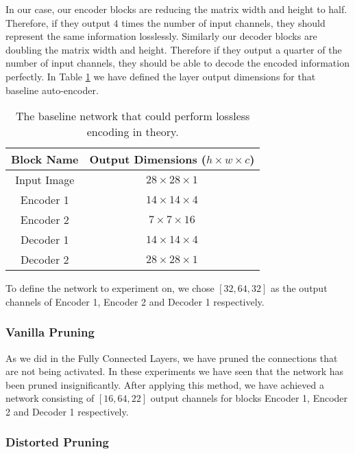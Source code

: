 In our case, our encoder blocks are reducing the matrix width and height to half. Therefore, if they output $4$ times the number of input channels, they should represent the same information losslessly. Similarly our decoder blocks are doubling the matrix width and height. Therefore if they output a quarter of the number of input channels, they should be able to decode the encoded information perfectly. In Table \ref{tab:mnist_baseline_encoder} we have defined the layer output dimensions for that baseline auto-encoder.
\begin{table}
\begin{center}
\begin{tabular}{ c | c }
 Block Name & Output Dimensions ($h \times w \times c$) \\
 \hline
 Input Image & $28 \times 28 \times 1$ \\
 Encoder 1 & $14 \times 14 \times 4$ \\  
 Encoder 2 & $7 \times 7 \times 16$ \\
 Decoder 1 & $14 \times 14 \times 4$ \\  
 Decoder 2 & $28 \times 28 \times 1$ 
\end{tabular}
\end{center}
\caption{The baseline network that could perform lossless encoding in theory.}
\label{tab:mnist_baseline_encoder}
\end{table}

To define the network to experiment on, we chose $[32, 64, 32]$ as the output channels of Encoder 1, Encoder 2 and Decoder 1 respectively.


\subsubsection{Vanilla Pruning}
As we did in the Fully Connected Layers, we have pruned the connections that are not being activated. In these experiments we have seen that the network has been pruned insignificantly. After applying this method, we have achieved a network consisting of $[16, 64, 22]$ output channels for blocks Encoder 1, Encoder 2 and Decoder 1 respectively.

\subsubsection{Distorted Pruning}




